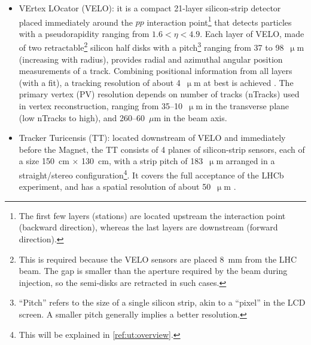 \begin{itemize}
    \item VErtex LOcator (VELO):
        it is a compact 21-layer silicon-strip detector placed immediately
        around the $pp$ interaction point\footnote{
            The first few layers (stations) are located upstream the interaction
            point (backward direction),
            whereas the last layers are downstream (forward direction).
        }
        \cite{The_LHCb_Collaboration_2008}
        that detects particles with a pseudorapidity ranging from
        $1.6 < \eta < 4.9$.
        Each layer of VELO,
        made of two retractable\footnote{
            This is required because the VELO sensors are placed 8~mm from the
            LHC beam.
            The gap is smaller than the aperture required by the beam during
            injection,
            so the semi-disks are retracted in such cases.
        } silicon half disks with a pitch\footnote{
            ``Pitch'' refers to the size of a single silicon strip, akin to a
            ``pixel'' in the LCD screen.
            A smaller pitch generally implies a better resolution.
        } ranging from 37 to 98~$\upmu$m (increasing with radius),
        provides radial and azimuthal angular position measurements of a track.
        Combining positional information from all layers (with a fit),
        a tracking resolution of about 4~$\upmu$m at best is achieved
        \cite{Aaij_2014}.
        The primary vertex (PV) resolution depends on number of tracks (nTracks)
        used in vertex reconstruction,
        ranging from 35--10~$\upmu$m in the transverse plane
        (low nTracks to high),
        and 260--60~$\mu$m in the beam axis.

    \item Tracker Turicensis (TT):
        located downstream of VELO and immediately before the Magnet,
        the TT consists of 4 planes of silicon-strip sensors,
        each of a size 150~cm $\times$ 130~cm,
        with a strip pitch of 183~$\upmu$m arranged in a straight/stereo
        configuration\footnote{
            This will be explained in \cref{ref:ut:overview}.
        }.
        It covers the full acceptance of the LHCb experiment, and has a spatial
        resolution of about 50~$\upmu$m
        \cite{The_LHCb_Collaboration_2008}.



\end{itemize}
